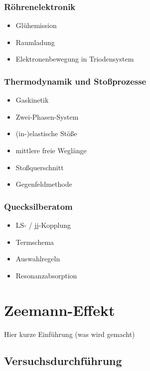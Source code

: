 \documentclass[11pt, a4paper]{article}
\begin{document}
\subsubsection{Röhrenelektronik}

\begin{itemize}
\item Glühemission
\item Raumladung
\item Elektronenbewegung in Triodensystem
\end{itemize}

\subsubsection{Thermodynamik und Stoßprozesse}

\begin{itemize}
\item Gaskinetik
\item Zwei-Phasen-System
\item (in-)elastische Stöße
\item mittlere freie Weglänge
\item Stoßquerschnitt
\item Gegenfeldmethode
\end{itemize}

\subsubsection{Quecksilberatom}

\begin{itemize}
\item LS- / jj-Kopplung
\item Termschema
\item Auswahlregeln
\item Resonanzabsorption
\end{itemize}

\section{Zeemann-Effekt}
Hier kurze Einführung (was wird gemacht)

\subsection{Versuchsdurchführung}
\end{document}
